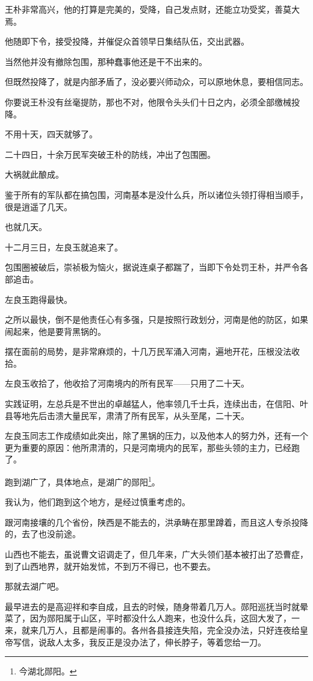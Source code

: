 \begin{multicols}{\theparacolNo}
王朴非常高兴，他的打算是完美的，受降，自己发点财，还能立功受奖，善莫大焉。

他随即下令，接受投降，并催促众首领早日集结队伍，交出武器。

当然他并没有撤除包围，那种蠢事他还是干不出来的。

但既然投降了，就是内部矛盾了，没必要兴师动众，可以原地休息，要相信同志。

你要说王朴没有丝毫提防，那也不对，他限令头头们十日之内，必须全部缴械投降。

不用十天，四天就够了。

二十四日，十余万民军突破王朴的防线，冲出了包围圈。

大祸就此酿成。

鉴于所有的军队都在搞包围，河南基本是没什么兵，所以诸位头领打得相当顺手，很是逍遥了几天。

也就几天。

十二月三日，左良玉就追来了。

包围圈被破后，崇祯极为恼火，据说连桌子都踹了，当即下令处罚王朴，并严令各部追击。

左良玉跑得最快。

之所以最快，倒不是他责任心有多强，只是按照行政划分，河南是他的防区，如果闹起来，他是要背黑锅的。

摆在面前的局势，是非常麻烦的，十几万民军涌入河南，遍地开花，压根没法收拾。

左良玉收拾了，他收拾了河南境内的所有民军——只用了二十天。

实践证明，左总兵是不世出的卓越猛人，他率领几千士兵，连续出击，在信阳、叶县等地先后击溃大量民军，肃清了所有民军，从头至尾，二十天。

左良玉同志工作成绩如此突出，除了黑锅的压力，以及他本人的努力外，还有一个更为重要的原因：他所肃清的，只是河南境内的民军，那些头领的主力，已经跑了。

跑到湖广了，具体地点，是湖广的郧阳\footnote{今湖北郧阳。}。

我认为，他们跑到这个地方，是经过慎重考虑的。

跟河南接壤的几个省份，陕西是不能去的，洪承畴在那里蹲着，而且这人专杀投降的，去了也没前途。

山西也不能去，虽说曹文诏调走了，但几年来，广大头领们基本被打出了恐曹症，到了山西地界，就开始发怵，不到万不得已，也不要去。

那就去湖广吧。

最早进去的是高迎祥和李自成，且去的时候，随身带着几万人。郧阳巡抚当时就晕菜了，因为郧阳属于山区，平时都没什么人跑来，也没什么兵，这回大发了，一来，就来几万人，且都是闹事的。各州各县接连失陷，完全没办法，只好连夜给皇帝写信，说敌人太多，我反正是没办法了，伸长脖子，等着您给一刀。


\end{multicols}
